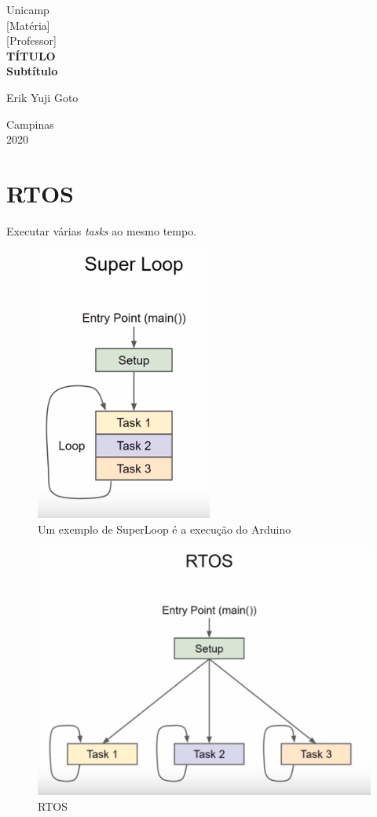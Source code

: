 \documentclass[a4paper, 12pt]{article}
\begin{document}
%
\begin{titlepage} %
	\begin{center} %
		{\large Unicamp}\\[0.2cm] %
		{\large [Matéria]}\\[0.2cm] %
		{\large [Professor]}\\[3.2cm]
		{\bf \huge TÍTULO}\\[0.2cm] 
		{\bf \large Subtítulo}\\[4.9cm]
	\end{center} %
	{\large Erik Yuji Goto}\\[10cm] %
	\begin{center}
		{\large Campinas}\\[0.2cm]
		{\large 2020}
	\end{center}
\end{titlepage} %


\tableofcontents
\newpage

\section{RTOS}
Executar várias \textit{tasks} ao mesmo tempo.
\begin{figure}[h]
	\centering
	\includegraphics[width=0.3\linewidth]{imagens/screenshot001}
	\caption{Um exemplo de SuperLoop é a execução do Arduino}
	\label{fig:screenshot001}
\end{figure}

\begin{figure}[h]
	\centering
	\includegraphics[width=0.5\linewidth]{imagens/screenshot002}
	\caption{RTOS}
	\label{fig:screenshot002}
\end{figure}
\end{document}
